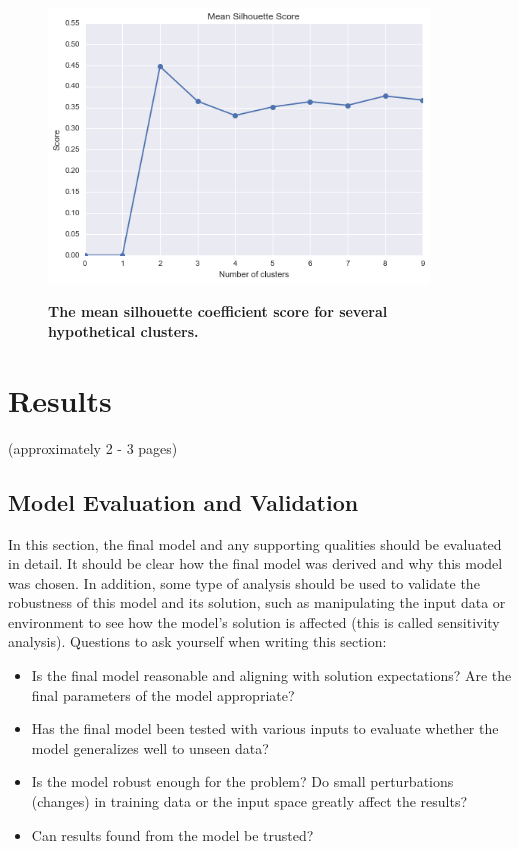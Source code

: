 \documentclass[twoside,openright,titlepage,numbers=noenddot,headinclude,%
               footinclude=true,cleardoublepage=empty,abstractoff,BCOR=5mm,%
               paper=a4,fontsize=11pt,ngerman,american]{scrreprt}
\numberwithin{theorem}{chapter}
\numberwithin{definition}{chapter}
\numberwithin{algorithm}{chapter}
\numberwithin{figure}{chapter}
\numberwithin{table}{chapter}
\numberwithin{equation}{chapter}
\begin{document}
\begin{figure}[!hbtp]
\centering
    
    \includegraphics[width=0.9\textwidth]{figures/meanSilhouetteScore}
    \label{meanSilhouetteScore}
    
    \caption{\textbf{The mean silhouette coefficient score for several hypothetical clusters.}}
\end{figure}


\chapter*{Results}
(approximately 2 - 3 pages)


\section*{Model Evaluation and Validation}
In this section, the final model and any supporting qualities should be evaluated in detail. It should be clear how the final model was derived and why this model was chosen. In addition, some type of analysis should be used to validate the robustness of this model and its solution, such as manipulating the input data or environment to see how the model’s solution is affected (this is called sensitivity analysis). Questions to ask yourself when writing this section:
\begin{itemize}%
\item Is the final model reasonable and aligning with solution expectations? Are the final parameters of the model appropriate?
\item Has the final model been tested with various inputs to evaluate whether the model generalizes well to unseen data?
\item Is the model robust enough for the problem? Do small perturbations (changes) in training data or the input space greatly affect the results?
\item Can results found from the model be trusted?
\end{itemize}
\end{document}

